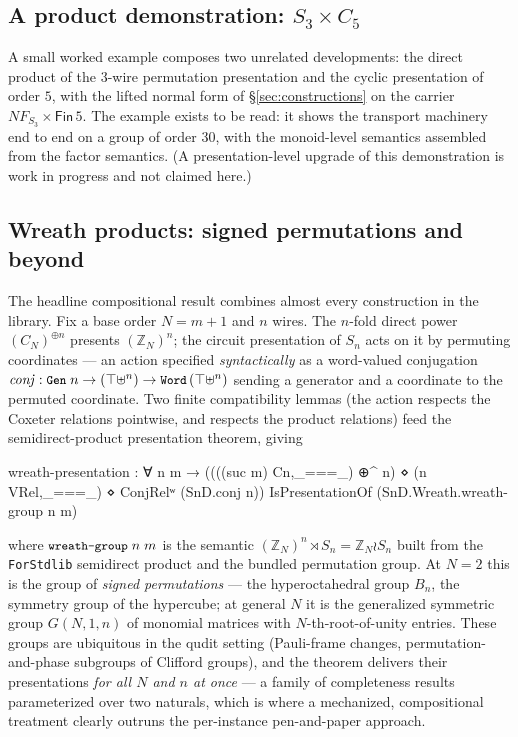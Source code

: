\subsection{A product demonstration: $S_3 \times C_5$}

A small worked example composes two unrelated developments: the direct
product of the $3$-wire permutation presentation and the cyclic
presentation of order $5$, with the lifted normal form of
\S\ref{sec:constructions} on the carrier $\mathit{NF}_{S_3} \times
\mathsf{Fin}\,5$.  The example exists to be read: it shows the transport
machinery end to end on a group of order $30$, with the monoid-level
semantics assembled from the factor semantics.  (A presentation-level
upgrade of this demonstration is work in progress and not claimed here.)

\subsection{Wreath products: signed permutations and beyond}

The headline compositional result combines almost every construction in
the library.  Fix a base order $N = m{+}1$ and $n$ wires.  The $n$-fold
direct power $(C_N)^{\oplus n}$ presents $(\mathbb{Z}_N)^n$; the circuit
presentation of $S_n$ acts on it by permuting coordinates --- an action
specified \emph{syntactically} as a word-valued conjugation
$\mathit{conj} : \mbox{\texttt{\small Gen}}\;n \to (\top \uplus^n) \to
\mbox{\texttt{\small Word}}\,(\top \uplus^n)$ sending a generator and a coordinate to the
permuted coordinate.  Two finite compatibility lemmas (the action
respects the Coxeter relations pointwise, and respects the product
relations) feed the semidirect-product presentation theorem, giving
\begin{agdacode}
wreath-presentation : ∀ n m →
  ((((suc m) Cn,_===_) ⊕^ n) ⋄ (n VRel,_===_) ⋄ ConjRelʷ (SnD.conj {n}))
    IsPresentationOf (SnD.Wreath.wreath-group n m)
\end{agdacode}
where $\mbox{\texttt{\small wreath-group}}\;n\;m$ is the semantic
$(\mathbb{Z}_N)^n \rtimes S_n = \mathbb{Z}_N \wr S_n$ built from the
\texttt{ForStdlib} semidirect product and the bundled permutation group.
At $N = 2$ this is the group of \emph{signed permutations} --- the
hyperoctahedral group $B_n$, the symmetry group of the hypercube; at
general $N$ it is the generalized symmetric group $G(N,1,n)$ of monomial
matrices with $N$-th-root-of-unity entries.  These groups are ubiquitous
in the qudit setting (Pauli-frame changes, permutation-and-phase
subgroups of Clifford groups), and the theorem delivers their
presentations \emph{for all $N$ and $n$ at once} --- a family of
completeness results parameterized over two naturals, which is where a
mechanized, compositional treatment clearly outruns the per-instance
pen-and-paper approach.

